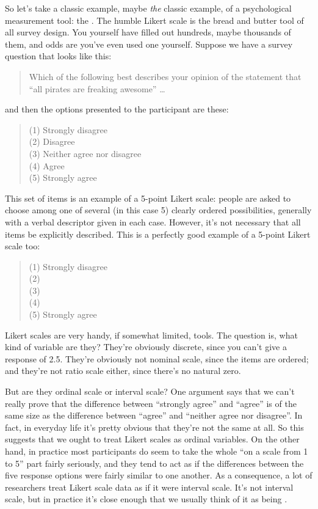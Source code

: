 So let's take a classic example, maybe {\it the} classic example, of a psychological measurement tool: the . The humble Likert scale is the bread and butter tool of all survey design. You yourself have filled out hundreds, maybe thousands of them, and odds are you've even used one yourself. Suppose we have a survey question that looks like this:

\begin{quote}
Which of the following best describes your opinion of the statement that ``all pirates are freaking awesome'' \ldots 
\end{quote}
and then the options presented to the participant are these:
\begin{quote}
(1) Strongly disagree\\
(2) Disagree\\
(3) Neither agree nor disagree\\
(4) Agree\\
(5) Strongly agree
\end{quote}
This set of items is an example of a 5-point Likert scale: people are asked to choose among one of several (in this case 5) clearly ordered possibilities, generally with a verbal descriptor given in each case. However, it's not necessary that all items be explicitly described. This is a perfectly good example of a 5-point Likert scale too: 
\begin{quote}
(1) Strongly disagree\\
(2) \\ (3) \\ (4) \\
(5) Strongly agree
\end{quote}

Likert scales are very handy, if somewhat limited, tools. The question is, what kind of variable are they? They're obviously discrete, since you can't give a response of 2.5. They're obviously not nominal scale, since the items are ordered; and they're not ratio scale either, since there's no natural zero. 

But are they ordinal scale or interval scale? One argument says that we can't really prove that the difference between ``strongly agree'' and ``agree'' is of the same size as the difference between ``agree'' and ``neither agree nor disagree''. In fact, in everyday life it's pretty obvious that they're not the same at all. So this suggests that we ought to treat Likert scales as ordinal variables. On the other hand, in practice most participants do seem to take the whole ``on a scale from 1 to 5'' part fairly seriously, and they tend to act as if the differences between the five response options were fairly similar to one another. As a consequence, a lot of researchers treat Likert scale data as if it were interval scale. It's not interval scale, but in practice it's close enough that we usually think of it as being .  

